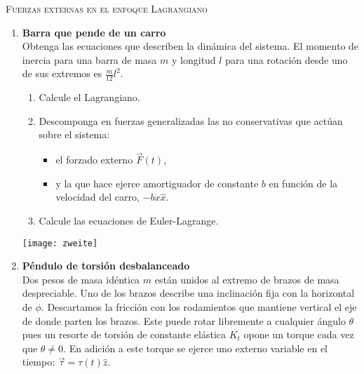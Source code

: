 \documentclass[11pt, spanish, a4paper, twoside]{article}
\begin{document}
\begin{center}
  \textsc{\large Fuerzas externas en el enfoque Lagrangiano}
\end{center}

\begin{enumerate}

\item 
\begin{minipage}[t][4.8cm]{0.55\textwidth} 
\textbf{Barra que pende de un carro}\\
Obtenga las ecuaciones que describen la dinámica del sistema.
El momento de inercia para una barra de masa \(m\) y longitud \(l\) para una rotación desde uno de sus extremos es \(\frac{m}{12} l^2\). 
\begin{enumerate}
	\item Calcule el Lagrangiano.
	\item Descomponga en fuerzas generalizadas las no conservativas que actúan sobre el sistema:
	\begin{itemize}
		\item el forzado externo \(\vec{F}(t)\),
		\item y la que hace ejerce amortiguador de constante \(b\) en función de la velocidad del carro,  \(- b \dot{x} \hat{x}\).
	\end{itemize}
	\item Calcule las ecuaciones de Euler-Lagrange. 
\end{enumerate}
\end{minipage}
\begin{minipage}[c][0cm][t]{0.4\textwidth}
	\texttt{[image: zweite]}
\end{minipage}




\item 
\begin{minipage}[t][5.5cm]{0.6\textwidth}
\textbf{Péndulo de torsión desbalanceado}\\
Dos pesos de masa idéntica $m$ están unidos al extremo de brazos de masa despreciable.
Uno de los brazos describe una inclinación fija con la horizontal de $\phi$.
Descartamos la fricción con los rodamientos que mantiene vertical el eje de donde parten los brazos.
Este puede rotar libremente a cualquier ángulo $\theta$ pues un resorte de torsión de constante elástica $K_t$ opone un torque cada vez que $\theta \neq 0$.
En adición a este torque se ejerce uno externo variable en el tiempo: $\vec{\tau}= \tau (t) \hat{z}$.


\end{minipage}
\end{enumerate}
\end{document}
